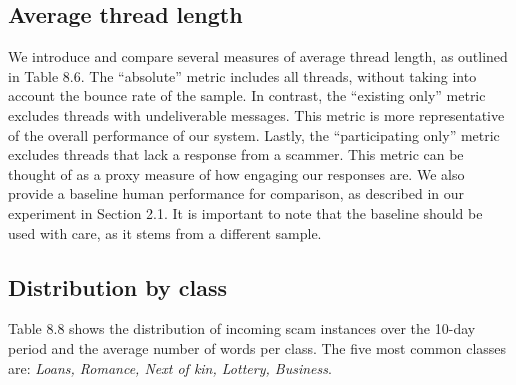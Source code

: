 \begin{table}[h]
  \centering
{}
\caption{Comparison of participation rates}
\end{table}
 
\subsection{Average thread length}
We introduce and compare several measures of average thread length, as outlined in Table 8.6.  The ``absolute'' metric includes all threads, without taking into account the bounce rate of the sample. In contrast, the ``existing only'' metric excludes threads with undeliverable messages. This metric is more representative of the overall performance of our system. Lastly, the ``participating only'' metric excludes threads that lack a response from a scammer. This metric can be thought of as a proxy measure of how engaging our responses are. We also provide a baseline human performance for comparison, as described in our experiment in Section 2.1. It is important to note that the baseline should be used with care, as it stems from a different sample.

\begin{table}[h]
  \centering
\caption{Comparison of average thread length}
\end{table}

\subsection{Distribution by class}
Table 8.8 shows the distribution of incoming scam instances over the 10-day period and the average number of words per class. The five most common classes are: \textit{Loans, Romance, Next of kin, Lottery, Business}.

